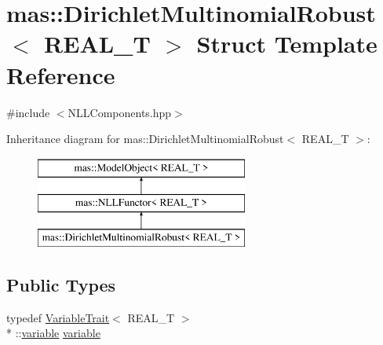 \hypertarget{structmas_1_1_dirichlet_multinomial_robust}{\section{mas\-:\-:Dirichlet\-Multinomial\-Robust$<$ R\-E\-A\-L\-\_\-\-T $>$ Struct Template Reference}
\label{structmas_1_1_dirichlet_multinomial_robust}
}


{\ttfamily \#include $<$N\-L\-L\-Components.\-hpp$>$}

Inheritance diagram for mas\-:\-:Dirichlet\-Multinomial\-Robust$<$ R\-E\-A\-L\-\_\-\-T $>$\-:\begin{figure}[H]
\begin{center}
\leavevmode
\includegraphics[height=3.000000cm]{structmas_1_1_dirichlet_multinomial_robust}
\end{center}
\end{figure}
\subsection*{Public Types}
\begin{DoxyCompactItemize}
\item 
typedef \hyperlink{structmas_1_1_variable_trait}{Variable\-Trait}$<$ R\-E\-A\-L\-\_\-\-T $>$\\*
\-::\hyperlink{structmas_1_1_dirichlet_multinomial_robust_ae46add67af1698359eaf6317847f42f1}{variable} \hyperlink{structmas_1_1_dirichlet_multinomial_robust_ae46add67af1698359eaf6317847f42f1}{variable}
\end{DoxyCompactItemize}
